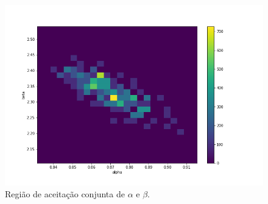 \documentclass[11pt,letterpaper,twocolumn]{article}
\begin{document}




\begin{figure}[hbt]
    \centering
    \includegraphics[scale = 0.40, center]{Gamma/fig09 - gamma.png}
    \caption{Região de aceitação conjunta de $\alpha$ e $\beta$.}
    \label{fig09g}
\end{figure}
\end{document}
